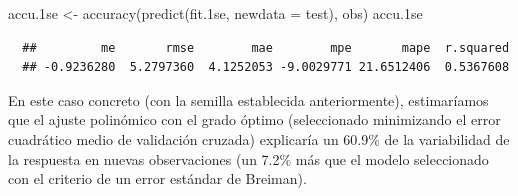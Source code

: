\documentclass[
]{book}
\newenvironment{Shaded}{\begin{snugshade}}{\end{snugshade}}
\newcommand{\AttributeTok}[1]{\textcolor[rgb]{0.77,0.63,0.00}{#1}}
\newcommand{\FloatTok}[1]{\textcolor[rgb]{0.00,0.00,0.81}{#1}}
\newcommand{\FunctionTok}[1]{\textcolor[rgb]{0.00,0.00,0.00}{#1}}
\newcommand{\NormalTok}[1]{#1}
\newcommand{\OtherTok}[1]{\textcolor[rgb]{0.56,0.35,0.01}{#1}}
\theoremstyle{break}
\theoremstyle{nonumberplain}
\begin{document}
\begin{Shaded}
\begin{Highlighting}[]
\NormalTok{accu}\FloatTok{.1}\NormalTok{se }\OtherTok{\textless{}{-}} \FunctionTok{accuracy}\NormalTok{(}\FunctionTok{predict}\NormalTok{(fit}\FloatTok{.1}\NormalTok{se, }\AttributeTok{newdata =}\NormalTok{ test), obs)}
\NormalTok{accu}\FloatTok{.1}\NormalTok{se}
\end{Highlighting}
\end{Shaded}

\begin{verbatim}
  ##         me       rmse        mae        mpe       mape  r.squared 
  ## -0.9236280  5.2797360  4.1252053 -9.0029771 21.6512406  0.5367608
\end{verbatim}

En este caso concreto (con la semilla establecida anteriormente), estimaríamos que el ajuste polinómico con el grado óptimo (seleccionado minimizando el error cuadrático medio de validación cruzada) explicaría un 60.9\% de la variabilidad de la respuesta en nuevas observaciones (un 7.2\% más que el modelo seleccionado con el criterio de un error estándar de Breiman).
\end{document}
